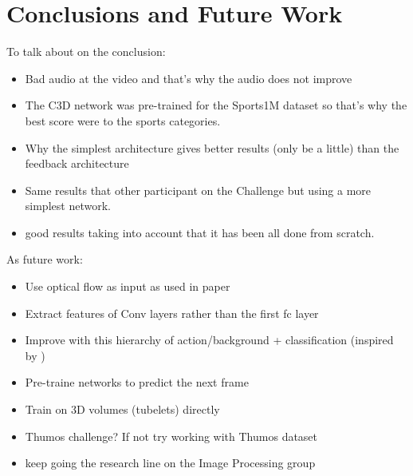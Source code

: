 \chapter{Conclusions and Future Work}

To talk about on the conclusion:
\begin{itemize}
	\item Bad audio at the video and that's why the audio does not improve
    \item The C3D network was pre-trained for the Sports1M dataset so that's why the best score were to the sports categories.
    \item Why the simplest architecture gives better results (only be a little) than the feedback architecture
    \item Same results that other participant on the Challenge but using a more simplest network.
    \item good results taking into account that it has been all done from scratch.
\end{itemize}


As future work:
\begin{itemize}
    \item Use optical flow as input as used in paper \cite{simonyan2014two}\cite{Ng_2015_CVPR}\cite{Yao_2015_ICCV}
    \item Extract features of Conv layers rather than the first fc layer
    \item Improve with this hierarchy of action/background + classification (inspired by \cite{shoutemporal})
    \item Pre-traine networks to predict the next frame
    \item Train on 3D volumes (tubelets) directly
    \item Thumos challenge? If not try working with Thumos dataset\cite{THUMOS15}
    \item keep going the research line on the Image Processing group

\end{itemize}
